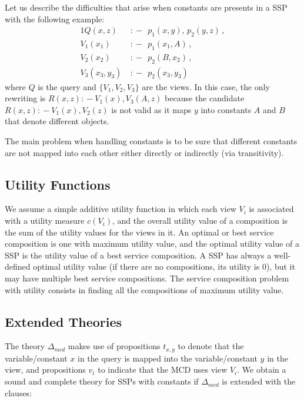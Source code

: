 \documentclass{article}
\newcommand{\qrule}{:\!\!-}
\begin{document}
{Let us describe the difficulties that arise when constants
are presents in a SSP with the following example:
\begin{alignat*}{1}
Q(x,z)\ &\qrule\ \ p_1(x,y),\, p_2(y,z)\,, \\
V_1(x_1)\ &\qrule\ \ p_1(x_1,A)\,, \\
V_2(x_2)\ &\qrule\ \ p_2(B,x_2)\,, \\
V_3(x_3,y_3)\ &\qrule\ \ p_2(x_3,y_3)
\end{alignat*}
where $Q$ is the query and $\{V_1,V_2,V_3\}$ are the 
views. In this case, the only rewriting is 
$R(x,z)\qrule V_1(x),V_3(A,z)$ because the candidate 
$R(x,z)\qrule V_1(x),V_2(z)$ is not valid as it maps
$y$ into constants $A$ and $B$ that denote different
objects.

The main problem when handling constants is to
be sure that different constants are not mapped into
each other either directly or indirectly (via transitivity).

\subsection{Utility Functions}

We assume a simple additive utility function in which each view
$V_i$ is associated with a utility measure $c(V_i)$, and the overall utility value of
a composition is the sum of the utility values for the views in it.
An optimal or best service composition is one with maximum utility value,
and the optimal utility value of a SSP is the utility value of a best
service composition. A SSP has always a well-defined optimal
utility value (if there are no compositions, its utility is $0$),
but it may have multiple best service compositions.
The service composition problem with utility consists in finding
all the compositions of maximum utility value.



\subsection{Extended Theories}

The theory $\Delta_{mcd}$ makes use of propositions $t_{x,y}$
to denote that the variable/constant $x$ in the query is mapped
into the variable/constant $y$ in the view, and propositions $v_i$
to indicate that the MCD uses view $V_i$.
We obtain a sound and complete theory for SSPs with constants if
$\Delta_{mcd}$ is extended with the clauses:

}
\end{document}

